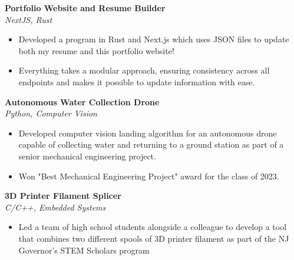 \documentclass[a4paper]{article}
\begin{document}
            {\textbf{Portfolio Website and Resume Builder}}\\
            \textit{NextJS, Rust}
            \vspace{-1mm}
            \begin{itemize} \itemsep 1pt
            
                    \item Developed a program in Rust and Next.js which uses JSON files to update both my resume and this portfolio website!
                
                    \item Everything takes a modular approach, ensuring consistency across all endpoints and makes it possible to update information with ease.
                
            \end{itemize}
            \vspace*{2mm}
            
            {\textbf{Autonomous Water Collection Drone}}\\
            \textit{Python, Computer Vision}
            \vspace{-1mm}
            \begin{itemize} \itemsep 1pt
            
                    \item Developed computer vision landing algorithm for an autonomous drone capable of collecting water and returning to a ground station as part of a senior mechanical engineering project.
                
                    \item Won "Best Mechanical Engineering Project" award for the class of 2023.
                
            \end{itemize}
            \vspace*{2mm}
            
            {\textbf{3D Printer Filament Splicer}}\\
            \textit{C/C++, Embedded Systems}
            \vspace{-1mm}
            \begin{itemize} \itemsep 1pt
            
                    \item Led a team of high school students alongside a colleague to develop a tool that combines two different spools of 3D printer filament as part of the NJ Governor’s STEM Scholars program
                
            \end{itemize}
            \vspace*{2mm}
            
\end{document}

